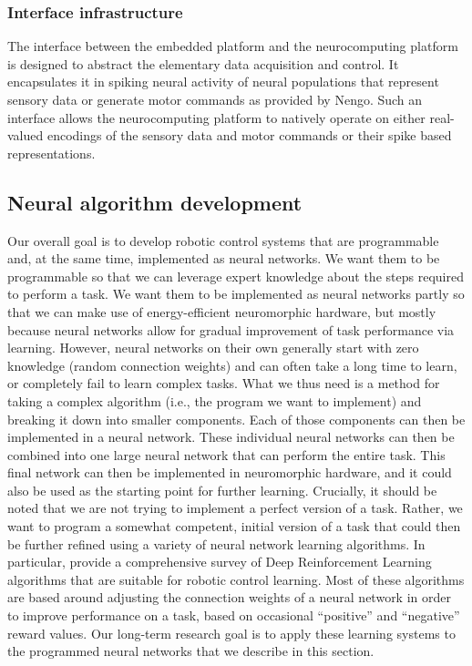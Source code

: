 \subsubsection{Interface infrastructure}%
\label{ssubsec:interface_infrastructure}

The interface between the embedded platform and the neurocomputing platform is designed to abstract the elementary data acquisition and control. 
It encapsulates it in spiking neural activity of neural populations that represent sensory data or generate motor commands as provided by \ac{Nengo}. 
Such an interface allows the neurocomputing platform to natively operate on either real-valued encodings of the sensory data and motor commands or their spike based representations.

\subsection{Neural algorithm development}%
\label{subsec:neural_algorithm_development}

Our overall goal is to develop robotic control systems that are programmable and, at the same time, implemented as neural networks. 
We want them to be programmable so that we can leverage expert knowledge about the steps required to perform a task. 
We want them to be implemented as neural networks partly so that we can make use of energy-efficient neuromorphic hardware, but mostly because neural networks allow for gradual improvement of task performance via learning. 
However, neural networks on their own generally start with zero knowledge (random connection weights) and can often take a long time to learn, or completely fail to learn complex tasks.
What we thus need is a method for taking a complex algorithm (i.e., the program we want to implement) and breaking it down into smaller components. 
Each of those components can then be implemented in a neural network. 
These individual neural networks can then be combined into one large neural network that can perform the entire task. 
This final network can then be implemented in neuromorphic hardware, and it could also be used as the starting point for further learning.
Crucially, it should be noted that we are not trying to implement a perfect version of a task. 
Rather, we want to program a somewhat competent, initial version of a task that could then be further refined using a variety of neural network learning algorithms. 
In particular, \cite{Duan2016} provide a comprehensive survey of Deep Reinforcement Learning algorithms that are suitable for robotic control learning. 
Most of these algorithms are based around adjusting the connection weights of a neural network in order to improve performance on a task, based on occasional “positive” and “negative” reward values. 
Our long-term research goal is to apply these learning systems to the programmed neural networks that we describe in this section.

